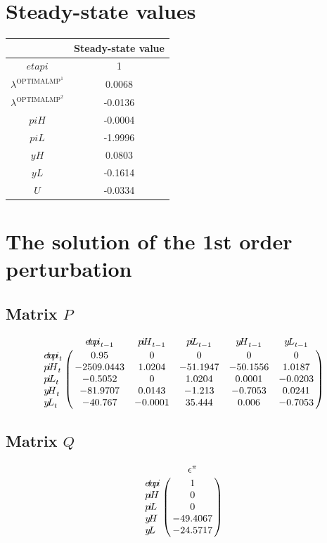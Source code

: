 

\section{Steady-state values}


\begin{tabular}{c|c|}
  & Steady-state value\\
\hline
${e\!t\!a\!p\!i}$ & 1 \\
$\lambda^{\mathrm{OPTIMALMP}^{\mathrm{1}}}$ & 0.0068 \\
$\lambda^{\mathrm{OPTIMALMP}^{\mathrm{2}}}$ & -0.0136 \\
${p\!i\!H}$ & -0.0004 \\
${p\!i\!L}$ & -1.9996 \\
${y\!H}$ & 0.0803 \\
${y\!L}$ & -0.1614 \\
$U$ & -0.0334 \\
\hline
\end{tabular}


\section{The solution of the 1st order perturbation}

\subsection*{Matrix $P$}

$$\bordermatrix{
~ & {e\!t\!a\!p\!i}_{t-1} & {p\!i\!H}_{t-1} & {p\!i\!L}_{t-1} & {y\!H}_{t-1} & {y\!L}_{t-1} \cr
{e\!t\!a\!p\!i}_{t} & 0.95 & 0 & 0 & 0 & 0 \cr
{p\!i\!H}_{t} & -2509.0443 & 1.0204 & -51.1947 & -50.1556 & 1.0187 \cr
{p\!i\!L}_{t} & -0.5052 & 0 & 1.0204 & 0.0001 & -0.0203 \cr
{y\!H}_{t} & -81.9707 & 0.0143 & -1.213 & -0.7053 & 0.0241 \cr
{y\!L}_{t} & -40.767 & -0.0001 & 35.444 & 0.006 & -0.7053 \cr
}$$

\subsection*{Matrix $Q$}

$$\bordermatrix{
~ & \epsilon^{\pi} \cr
{e\!t\!a\!p\!i} & 1 \cr
{p\!i\!H} & 0 \cr
{p\!i\!L} & 0 \cr
{y\!H} & -49.4067 \cr
{y\!L} & -24.5717 \cr
}$$

